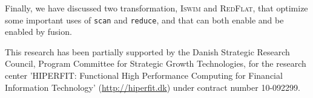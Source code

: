 \documentclass{sigplanconf}  %
\begin{document}
Finally, we have discussed two transformation, \textsc{Iswim}
and \textsc{RedFlat}, that optimize some important uses
of {\tt scan} and {\tt reduce}, and that can both enable and 
be enabled by fusion.


%



\acks
This research has been partially supported by the Danish
Strategic Research Council, Program Committee for Strategic Growth
Technologies, for the research center 'HIPERFIT: Functional High
Performance Computing for Financial Information Technology'
(\url{http://hiperfit.dk}) under contract number 10-092299.




\softraggedright

\end{document}
